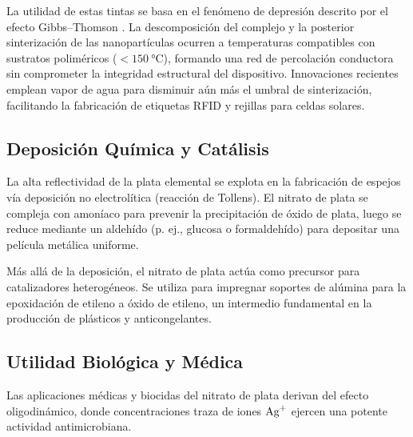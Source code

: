\documentclass[pdflatex,sn-mathphys-num,draft]{sn-jnl}
\theoremstyle{thmstyleone}%
\theoremstyle{thmstyletwo}%
\theoremstyle{thmstylethree}%
\begin{document}
La utilidad de estas tintas se basa en el fenómeno de depresión descrito por el
efecto Gibbs--Thomson \cite{Castro2005, Asoro2009}. La descomposición del complejo y
la posterior sinterización de las nanopartículas ocurren a temperaturas
compatibles con sustratos poliméricos ($< \qty{150}{\degreeCelsius}$), formando
una red de percolación conductora sin comprometer la integridad estructural del
dispositivo. Innovaciones recientes emplean vapor de agua para disminuir aún más
el umbral de sinterización, facilitando la fabricación de etiquetas RFID y
rejillas para celdas solares.

\subsection{Deposición Química y Catálisis}
La alta reflectividad de la plata elemental se explota en la fabricación de
espejos vía deposición no electrolítica (reacción de Tollens). El nitrato de
plata se compleja con amoníaco para prevenir la precipitación de óxido de plata,
luego se reduce mediante un aldehído (p. ej., glucosa o formaldehído) para
depositar una película metálica uniforme.

Más allá de la deposición, el nitrato de plata actúa como precursor para
catalizadores heterogéneos. Se utiliza para impregnar soportes de alúmina para
la epoxidación de etileno a óxido de etileno, un intermedio fundamental en la
producción de plásticos y anticongelantes.

\subsection{Utilidad Biológica y Médica}
Las aplicaciones médicas y biocidas del nitrato de plata derivan del efecto
oligodinámico, donde concentraciones traza de iones $\ce{Ag+}$ ejercen una
potente actividad antimicrobiana.
\end{document}
